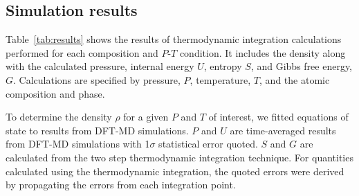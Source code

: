 \subsection{Simulation results} \label{sec:simulation}
Table~\ref{tab:results} shows the results of thermodynamic integration
calculations performed for each composition and $P$-$T$ condition. It
includes the density along with the calculated pressure, internal energy
$U$, entropy $S$, and Gibbs free energy, $G$. Calculations are specified by
pressure, $P$, temperature, $T$, and the atomic composition and phase.

To determine the density $\rho$ for a given $P$ and $T$ of interest, we
fitted equations of state to results from DFT-MD simulations. $P$ and $U$
are time-averaged results from DFT-MD simulations with 1$\sigma$
statistical error quoted. $S$ and $G$ are calculated from the two step
thermodynamic integration technique. For quantities calculated using the
thermodynamic integration, the quoted errors were derived by propagating
the errors from each integration point.


